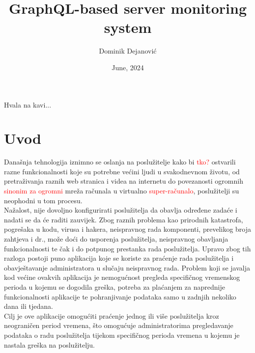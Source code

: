 \documentclass[zavrsnirad]{fer}
\title{GraphQL-based server monitoring system}
\author{Dominik Dejanović}
\date{June, 2024}
\begin{document}
\maketitle






\begin{zahvale}
  Hvala na kavi...
\end{zahvale}


\mainmatter


\tableofcontents


\chapter{Uvod}
\label{pog:uvod}
Današnja tehnologija iznimno se oslanja na poslužitelje kako bi \textcolor{red}{tko?} ostvarili razne funkcionalnosti koje su potrebne većini ljudi u svakodnevnom životu, od pretraživanja raznih web stranica i videa na internetu do povezanosti ogromnih \textcolor{red}{sinonim za ogromni} mreža računala u virtualno \textcolor{red}{super-računalo}, poslužitelji su neophodni u tom procesu. 
\\Nažalost, nije dovoljno konfigurirati poslužitelja da obavlja određene zadaće i nadati se da će raditi zauvijek. Zbog raznih problema kao prirodnih katastrofa, pogrešaka u kodu, virusa i hakera, neispravnog rada komponenti, prevelikog broja zahtjeva i dr., može doći do usporenja poslužitelja, neispravnog obavljanja funkcionalnosti te čak i do potpunog prestanka rada poslužitelja. Upravo zbog tih razloga postoji puno aplikacija koje se koriste za praćenje rada poslužitelja i obavještavanje administratora u slučaju neispravnog rada. Problem koji se javalja kod većine ovakvih aplikacija je nemogućnost pregleda specifičnog vremenskog perioda u kojemu se dogodila greška, potreba za plaćanjem za naprednije funkcionalnosti aplikacije te pohranjivanje podataka samo u zadnjih nekoliko dana ili tjedana.
\\Cilj je ove aplikacije omogućiti praćenje jednog ili više poslužitelja kroz neograničen period vremena, što omogućuje administratorima pregledavanje podataka o radu poslužitelja tijekom specifičnog perioda vremena u kojemu je nastala greška na poslužitelju.
\end{document}
